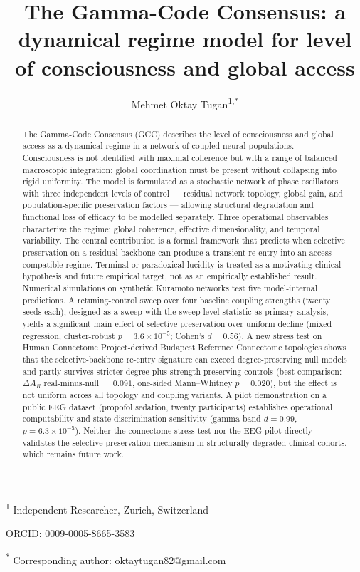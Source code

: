 \documentclass[11pt,a4paper]{article}
\title{%
  \textbf{The Gamma-Code Consensus: a dynamical regime model for level of consciousness and global access}
}
\author{%
  Mehmet Oktay Tugan\textsuperscript{1,*}
}
\date{}
\theoremstyle{plain}
\theoremstyle{definition}
\theoremstyle{remark}
\begin{document}
\maketitle
\thispagestyle{fancy}

\noindent
\textsuperscript{1} Independent Researcher, Zurich, Switzerland

\noindent
ORCID: 0009-0005-8665-3583

\noindent
\textsuperscript{*} Corresponding author: oktaytugan82@gmail.com

\bigskip

\begin{abstract}
\noindent
The Gamma-Code Consensus (GCC) describes the level of consciousness and global access as a dynamical regime in a network of coupled neural populations. Consciousness is not identified with maximal coherence but with a range of balanced macroscopic integration: global coordination must be present without collapsing into rigid uniformity. The model is formulated as a stochastic network of phase oscillators with three independent levels of control --- residual network topology, global gain, and population-specific preservation factors --- allowing structural degradation and functional loss of efficacy to be modelled separately. Three operational observables characterize the regime: global coherence, effective dimensionality, and temporal variability. The central contribution is a formal framework that predicts when selective preservation on a residual backbone can produce a transient re-entry into an access-compatible regime. Terminal or paradoxical lucidity is treated as a motivating clinical hypothesis and future empirical target, not as an empirically established result. Numerical simulations on synthetic Kuramoto networks test five model-internal predictions. A retuning-control sweep over four baseline coupling strengths (twenty seeds each), designed as a sweep with the sweep-level statistic as primary analysis, yields a significant main effect of selective preservation over uniform decline (mixed regression, cluster-robust $p = 3.6 \times 10^{-5}$; Cohen's $d = 0.56$). A new stress test on Human Connectome Project-derived Budapest Reference Connectome topologies shows that the selective-backbone re-entry signature can exceed degree-preserving null models and partly survives stricter degree-plus-strength-preserving controls (best comparison: $\Delta A_R$ real-minus-null $=0.091$, one-sided Mann--Whitney $p=0.020$), but the effect is not uniform across all topology and coupling variants. A pilot demonstration on a public EEG dataset (propofol sedation, twenty participants) establishes operational computability and state-discrimination sensitivity (gamma band $d = 0.99$, $p = 6.3 \times 10^{-5}$). Neither the connectome stress test nor the EEG pilot directly validates the selective-preservation mechanism in structurally degraded clinical cohorts, which remains future work.
\end{abstract}
\end{document}
